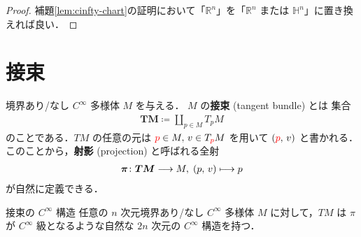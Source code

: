 \documentclass[TQFT_main]{subfiles}
\begin{document}
\begin{proof}
    補題\ref{lem:cinfty-chart}の証明において「$\mathbb{R}^n$」を「$\mathbb{R}^n$ または $\mathbb{H}^n$」に置き換えれば良い．
\end{proof}


\section{接束}

境界あり/なし $C^\infty$ 多様体 $M$ を与える．
$M$ の\textbf{接束} (tangent bundle) とは
集合
\begin{align}
    \bm{TM} \coloneqq \coprod_{p \in M} T_p M
\end{align}
のことである．$TM$ の任意の元は $\textcolor{red}{p} \in M,\, v \in T_{\textcolor{red}{p}} M$ を用いて $(\textcolor{red}{p},\, v)$ と書かれる．
このことから，\textbf{射影} (projection) と呼ばれる全射
\begin{align}
    \bm{\pi} \colon \bm{TM} \longrightarrow M,\; (p,\, v) \longmapsto p
\end{align}
が自然に定義できる．

\begin{myprop}[label=prop:tangentbundle]{接束の $C^\infty$ 構造}
    任意の $n$ 次元境界あり/なし $C^\infty$ 多様体 $M$ に対して，$TM$ は $\pi$ が $C^\infty$ 級となるような自然な $2n$ 次元の $C^\infty$ 構造を持つ．
\end{myprop}
\end{document}

